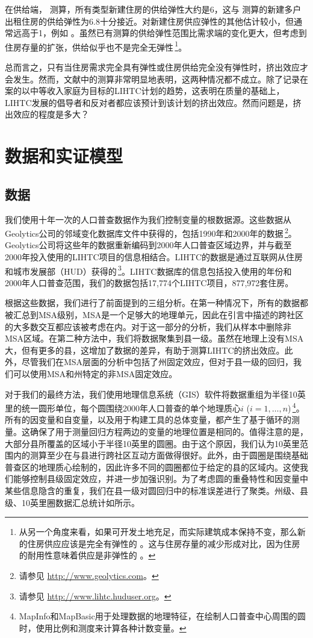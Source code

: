 \documentclass[lang=cn,11pt,a4paper]{paper}
\begin{document}
在供给端，\cite{Mayer200085} 测算，所有类型新建住房的供给弹性大约是6，这与 \cite{DiPasquale1992337} 测算的新建多户出租住房的供给弹性为6.8十分接近。对新建住房供应弹性的其他估计较小，但通常远高于1，例如 \citep{DiPasquale1992337,Rosen19791}。虽然已有测算的供给弹性范围比需求端的变化更大，但考虑到住房存量的扩张，供给似乎也不是完全无弹性\,\footnote{从另一个角度来看，如果可开发土地充足，而实际建筑成本保持不变，那么新的住房供应应该是完全有弹性的 \citep{Rosenthal1994182}。这与住房存量的减少形成对比，因为住房的耐用性意味着供应是非弹性的 \citep{Glaeser2005345}。}。

总而言之，只有当住房需求完全具有弹性或住房供给完全没有弹性时，挤出效应才会发生。然而，文献中的测算非常明显地表明，这两种情况都不成立。除了记录在案的以中等收入家庭为目标的LIHTC计划的趋势，这表明在质量的基础上，LIHTC发展的倡导者和反对者都应该预计到该计划的挤出效应。然而问题是，挤出效应的程度是多大？

\section{数据和实证模型}\label{sec4}

\subsection{数据}

我们使用十年一次的人口普查数据作为我们控制变量的根数据源。这些数据从Geolytics公司的邻域变化数据库文件中获得的，包括1990年和2000年的数据\,\footnote{请参见 \url{http://www.geolytics.com}。}。Geolytics公司将这些年的数据重新编码到2000年人口普查区域边界，并与截至2000年投入使用的LIHTC项目的信息相结合。LIHTC的数据是通过互联网从住房和城市发展部（HUD）获得的\,\footnote{请参见 \url{http://www.lihtc.huduser.org}。}。LIHTC数据库的信息包括投入使用的年份和2000年人口普查范围，我们的数据包括17,774个LIHTC项目，877,972套住房。

根据这些数据，我们进行了前面提到的三组分析。在第一种情况下，所有的数据都被汇总到MSA级别，MSA是一个足够大的地理单元，因此在引言中描述的跨社区的大多数交互都应该被考虑在内。对于这一部分的分析，我们从样本中删除非MSA区域。在第二种方法中，我们将数据聚集到县一级。虽然在地理上没有MSA大，但有更多的县，这增加了数据的差异，有助于测算LIHTC的挤出效应。此外，尽管我们在MSA层面的分析中包括了州固定效应，但对于县一级的回归，我们可以使用MSA和州特定的非MSA固定效应。

对于我们的最终方法，我们使用地理信息系统（GIS）软件将数据重组为半径10英里的统一圆形单位，每个圆围绕2000年人口普查的单个地理质心$i$ ($i = 1, \dots,n$)\,\footnote{MapInfo和MapBasic用于处理数据的地理特征，在绘制人口普查中心周围的圆时，使用比例和测度来计算各种计数变量。}。所有的因变量和自变量，以及用于构建工具的总体变量，都产生了基于循环的测量。这确保了用于测量回归方程两边的变量的地理位置是相同的。值得注意的是，大部分县所覆盖的区域小于半径10英里的圆圈。由于这个原因，我们认为10英里范围内的测算至少在与县进行跨社区互动方面做得很好。此外，由于圆圈是围绕基础普查区的地理质心绘制的，因此许多不同的圆圈都位于给定的县的区域内。这使我们能够控制县级固定效应，并进一步加强识别。为了考虑圆的重叠特性和因变量中某些信息隐含的重复，我们在县一级对圆回归中的标准误差进行了聚类。州级、县级、10英里圈数据汇总统计如所示。
\end{document}
